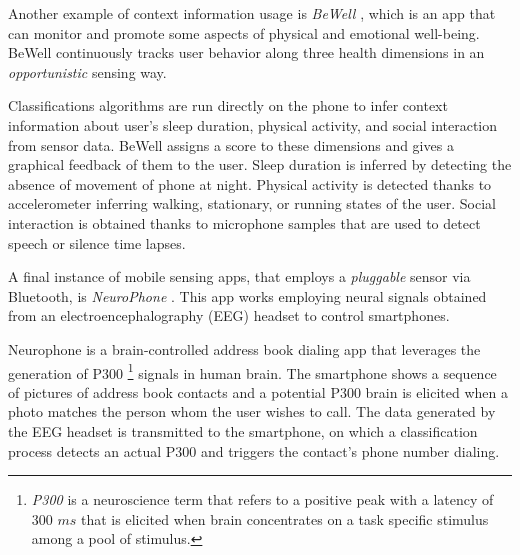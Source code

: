 Another example of context information usage is \emph{BeWell} \cite{Lane2012}, which is an app that can monitor and promote some aspects of physical and emotional well-being.
BeWell continuously tracks user behavior along three health dimensions in an \emph{opportunistic} sensing way.

Classifications algorithms are run directly on the phone to infer context information about user's sleep duration, physical activity, and social interaction from sensor data.
BeWell assigns a score to these dimensions and gives a graphical feedback of them to the user.
Sleep duration is inferred by detecting the absence of movement of phone at night.
Physical activity is detected thanks to accelerometer inferring walking, stationary, or running states of the user.
Social interaction is obtained thanks to microphone samples that are used to detect speech or silence time lapses.


A final instance of mobile sensing apps, that employs a \emph{pluggable} sensor via Bluetooth, is \emph{NeuroPhone} \cite{Campbell2010}.
This app works employing neural signals obtained from an electroencephalography (EEG) headset to control smartphones.


Neurophone is a brain-controlled address book dialing app that leverages the generation of P300 \footnote{\emph{P300} is a neuroscience term that refers to a positive peak with a latency of 300 $ms$ that is elicited when brain concentrates on a task specific stimulus among a pool of stimulus.} signals in human brain.
The smartphone shows a sequence of pictures of address book contacts and a potential P300 brain is elicited when a photo matches the person whom the user wishes to call.
The data generated by the EEG headset is transmitted to the smartphone, on which a classification process detects an actual P300 and triggers the contact’s phone number dialing.


